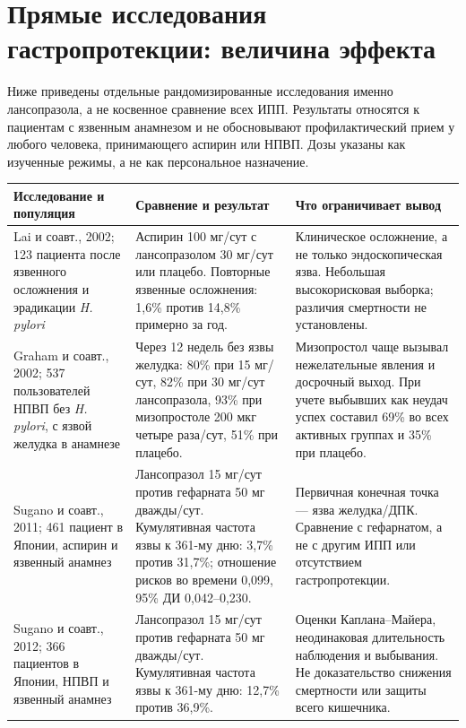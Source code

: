 \documentclass[11pt,a4paper,notitlepage]{report}
\newcommand{\Hp}{\textit{H. pylori}}
\newcommand{\src}[1]{\unskip\space\cite{#1}}
\begin{document}
\section{Прямые исследования гастропротекции: величина эффекта}
\label{sec:gastroprotection-trials}
Ниже приведены отдельные рандомизированные исследования именно лансопразола, а не косвенное сравнение всех ИПП. Результаты относятся к пациентам с язвенным анамнезом и не обосновывают профилактический прием у любого человека, принимающего аспирин или НПВП. Дозы указаны как изученные режимы, а не как персональное назначение.\src{aspirintrial,misotrial,aspirin15,nsaid15}

\begin{longtable}{P{0.23\textwidth}P{0.34\textwidth}P{0.34\textwidth}}
\toprule
Исследование и популяция & Сравнение и результат & Что ограничивает вывод \\
\midrule
\endhead
Lai и соавт., 2002; 123 пациента после язвенного осложнения и эрадикации \Hp & Аспирин 100 мг/сут с лансопразолом 30 мг/сут или плацебо. Повторные язвенные осложнения: 1,6\% против 14,8\% примерно за год.\src{aspirintrial} & Клиническое осложнение, а не только эндоскопическая язва. Небольшая высокорисковая выборка; различия смертности не установлены. \\
Graham и соавт., 2002; 537 пользователей НПВП без \Hp, с язвой желудка в анамнезе & Через 12 недель без язвы желудка: 80\% при 15 мг/сут, 82\% при 30 мг/сут лансопразола, 93\% при мизопростоле 200 мкг четыре раза/сут, 51\% при плацебо.\src{misotrial} & Мизопростол чаще вызывал нежелательные явления и досрочный выход. При учете выбывших как неудач успех составил 69\% во всех активных группах и 35\% при плацебо. \\
Sugano и соавт., 2011; 461 пациент в Японии, аспирин и язвенный анамнез & Лансопразол 15 мг/сут против гефарната 50 мг дважды/сут. Кумулятивная частота язвы к 361-му дню: 3,7\% против 31,7\%; отношение рисков во времени 0,099, 95\% ДИ 0,042--0,230.\src{aspirin15} & Первичная конечная точка --- язва желудка/ДПК. Сравнение с гефарнатом, а не с другим ИПП или отсутствием гастропротекции. \\
Sugano и соавт., 2012; 366 пациентов в Японии, НПВП и язвенный анамнез & Лансопразол 15 мг/сут против гефарната 50 мг дважды/сут. Кумулятивная частота язвы к 361-му дню: 12,7\% против 36,9\%.\src{nsaid15} & Оценки Каплана--Майера, неодинаковая длительность наблюдения и выбывания. Не доказательство снижения смертности или защиты всего кишечника. \\
\bottomrule
\end{longtable}
\end{document}
